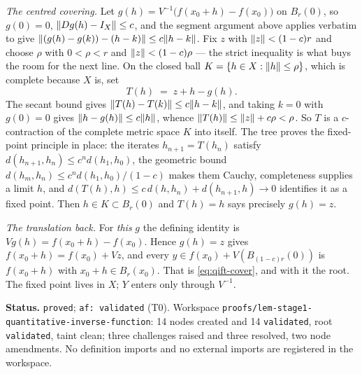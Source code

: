 \emph{The centred covering.} Let $g(h)=V^{-1}\bigl(f(x_0+h)-f(x_0)\bigr)$ on $B_r(0)$, so
$g(0)=0$, $\lVert Dg(h)-I_X\rVert\le c$, and the segment argument above applies verbatim to give
$\lVert (g(h)-g(k))-(h-k)\rVert\le c\lVert h-k\rVert$. Fix $z$ with $\lVert z\rVert<(1-c)r$ and choose $\rho$
with $0<\rho<r$ and $\lVert z\rVert<(1-c)\rho$ --- the strict inequality is what buys the room for
the next line. On the closed ball $K=\{h\in X:\lVert h\rVert\le\rho\}$, which is complete because
$X$ is, set
\[
  T(h)\;=\;z+h-g(h).
\]
The secant bound gives $\lVert T(h)-T(k)\rVert\le c\lVert h-k\rVert$, and taking $k=0$ with $g(0)=0$
gives $\lVert h-g(h)\rVert\le c\lVert h\rVert$, whence $\lVert T(h)\rVert\le\lVert z\rVert+c\rho<\rho$. So $T$ is a
$c$-contraction of the complete metric space $K$ into itself. The tree proves the
fixed-point principle in place: the iterates $h_{n+1}=T(h_n)$ satisfy
$d(h_{n+1},h_n)\le c^{n}d(h_1,h_0)$, the geometric bound
$d(h_m,h_n)\le c^{n}d(h_1,h_0)/(1-c)$ makes them Cauchy, completeness supplies a limit $h$,
and $d(T(h),h)\le c\,d(h,h_n)+d(h_{n+1},h)\to0$ identifies it as a fixed point. Then
$h\in K\subset B_r(0)$ and $T(h)=h$ says precisely $g(h)=z$.

\emph{The translation back.} For \emph{this} $g$ the defining identity is
$Vg(h)=f(x_0+h)-f(x_0)$. Hence $g(h)=z$ gives $f(x_0+h)=f(x_0)+Vz$, and every
$y\in f(x_0)+V(B_{(1-c)r}(0))$ is $f(x_0+h)$ with $x_0+h\in B_r(x_0)$. That is
\eqref{eq:qift-cover}, and with it the root. The fixed point lives in $X$; $Y$ enters only
through $V^{-1}$.

\medskip
\noindent\textbf{Status.} \texttt{proved}; \texttt{af: validated} (T0). Workspace
\texttt{proofs/lem-stage1-quantitative-inverse-function}: 14 nodes created and 14
\texttt{validated}, root \texttt{validated}, taint clean; three challenges raised and three
resolved, two node amendments. No definition imports and no external imports are registered
in the workspace.

